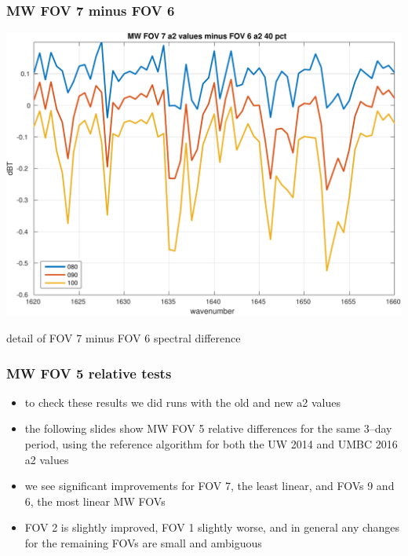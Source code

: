 \documentclass[11pt]{beamer}
\begin{document}
\begin{frame}
\frametitle{MW FOV 7 minus FOV 6}
\begin{center}
  \includegraphics[scale=0.5]{figures/MW_FOV_7_minus_6_a2_40.pdf}
\end{center}
\begin{center}
  detail of FOV 7 minus FOV 6 spectral difference
\end{center}
\end{frame}
\begin{frame}
\frametitle{MW FOV 5 relative tests}

\begin{itemize}

  \item to check these results we did {\ccast} runs with the old and
    new a2 values

  \item the following slides show MW FOV 5 relative differences for
    the same 3--day period, using the {\ccast} reference algorithm
    for both the UW 2014 and UMBC 2016 a2 values

  \item we see significant improvements for FOV 7, the least linear,
    and FOVs 9 and 6, the most linear MW FOVs

  \item FOV 2 is slightly improved, FOV 1 slightly worse, and in
    general any changes for the remaining FOVs are small and
    ambiguous

\end{itemize}

\end{frame}
\end{document}
